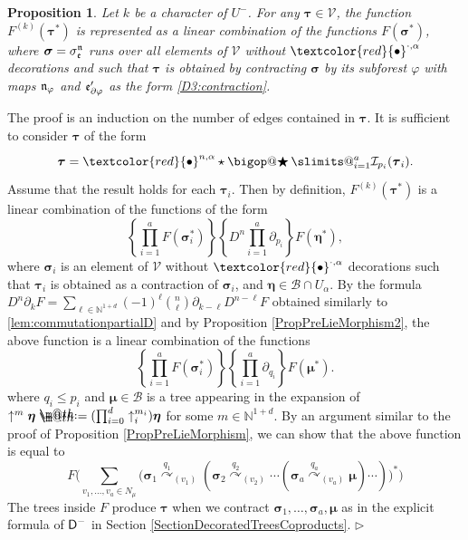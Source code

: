 \documentclass[10pt, reqno]{amsart}
\makeatletter
\numberwithin{subsection}{section}
\numberwithin{subsubsection}{subsection}
\numberwithin{equation}{section} %
\newenvironment{Dem}[1][\unskip]{%
    \begin{list}{\hspace{1.15cm}{\sf \textbf{{\small Proof #1 --}}}}{%
        \setlength{\topsep}{0pt}%
        \setlength{\leftmargin}{0pt}%
        \setlength{\rightmargin}{0pt}%
        \setlength{\listparindent}{0pt}%
        \setlength{\itemindent}{0pt}%
        \setlength{\parsep}{0pt}%
        \addtolength{\leftmargin}{0pt}%
        \addtolength{\rightmargin}{0pt}%
    } \item }{\hfill $\rhd$\end{list}\smallskip}
\theoremstyle{mystyle}
\newtheorem{prop}[thm]{\hspace{-0.13cm} {Proposition}}%
\theoremstyle{mystyle2}
\theoremstyle{mystyle3}
\DeclareRobustCommand\bigop[1]{%
  \mathop{\vphantom{\sum}\mathpalette\bigop@{#1}}\slimits@
}
\newcommand{\bigop@}[2]{%
  \vcenter{%
    \sbox\z@{$#1\sum$}%
    \hbox{\resizebox{\ifx#1\displaystyle.9\fi\dimexpr\ht\z@+\dp\z@}{!}{$\m@th#2$}}%
  }%
}
\newcommand{\Bigstar}{\DOTSB\bigop{\bigstar}}
\newcommand{\bstau}{\boldsymbol{\tau}}
\newcommand{\bssigma}{\boldsymbol{\sigma}}
\newcommand{\bseta}{\boldsymbol{\eta}}
\newcommand\bbN{\mathbb{N}}
\newcommand{\mcB}{\mathcal{B}}
\newcommand{\mcI}{\mathcal{I}}
\newcommand\mcV{\mathcal V}
\newcommand*{\defeq}{\mathrel{\rlap{%
                     \raisebox{0.3ex}{$\m@th\cdot$}}%
                     \raisebox{-0.3ex}{$\m@th\cdot$}}%
                     =}
\makeatother
\begin{document}
\medskip

\begin{prop}\label{Prop origin of red node}
Let $k$ be a character of $U^-$.
For any $\bstau\in\mcV$, the function $F^{(k)}(\bstau^*)$ is represented as a linear combination of the functions $F(\bssigma^*)$,
where $\bssigma=\sigma_{\frak{e}}^{\frak{n}}$ runs over all elements of 
$\mcV$
without $\textcolor{red}{\bullet}^{\cdot,\alpha}$ decorations and such that $\bstau$ is obtained by contracting $\bssigma$ by its subforest $\varphi$ with maps $\frak{n}_\varphi$ and $\frak{e}_{\partial\varphi}'$ as the form \eqref{D3:contraction}.
\end{prop}

\medskip

\begin{Dem}
The proof is an induction on the number of edges contained in $\bstau$. It is sufficient to consider $\bstau$ of the form
$$
\bstau = \textcolor{red}{\bullet}^{n,\alpha}\star\Bigstar_{i=1}^a \mcI_{p_i}(\bstau_i).
$$
Assume that the result holds for each $\bstau_i$. Then by definition, $F^{(k)}(\bstau^*)$ is a linear combination of the functions of the form
$$
\left\{\prod_{i=1}^aF(\bssigma_i^*)\right\}
\left\{D^n\prod_{i=1}^a \partial_{{p_i}}\right\}F(\bseta^*),
$$
where $\bssigma_i$ is an element of $\mcV$ without $\textcolor{red}{\bullet}^{\cdot,\alpha}$ decorations such that $\bstau_i$ is obtained as a contraction of $\bssigma_i$, and $\bseta\in\mcB\cap U_\alpha$. By the formula $D^n\partial_kF=\sum_{\ell\in\bbN^{1+d}}(-1)^\ell\binom{n}{\ell}\partial_{k-\ell}D^{n-\ell}F$ obtained similarly to \eqref{lem:commutationpartialD} and by Proposition \ref{PropPreLieMorphism2}, the above function is a linear combination of the functions
$$
\left\{\prod_{i=1}^aF(\bssigma_i^*)\right\}
\left\{\prod_{i=1}^a \partial_{q_i}\right\}F(\boldsymbol{\mu}^*).
$$
where $q_i\le p_i$ and $\boldsymbol{\mu}\in\mcB$ is a tree appearing in the expansion of $\uparrow^m\bseta\defeq(\prod_{i=0}^d\uparrow_i^{m_i})\bseta$ for some $m\in\bbN^{1+d}$. By an argument similar to the proof of Proposition \ref{PropPreLieMorphism}, we can show that the above function is equal to
$$
F\Big(\sum_{v_1,\dots,v_a\in N_\mu}
\big(\bssigma_1\overset{q_1}{\curvearrowright}_{(v_1)}
(\bssigma_2\overset{q_2}{\curvearrowright}_{(v_2)}
\cdots
(\bssigma_a\overset{q_a}{\curvearrowright}_{(v_a)}\boldsymbol{\mu})\cdots)
\big)^*\Big)
$$
The trees inside $F$ produce $\bstau$ when we contract $\bssigma_1,\dots,\bssigma_a,\boldsymbol{\mu}$ as in the explicit formula of ${\sf D}^-$ in Section \ref{SectionDecoratedTreesCoproducts}.
\end{Dem}
\end{document}
